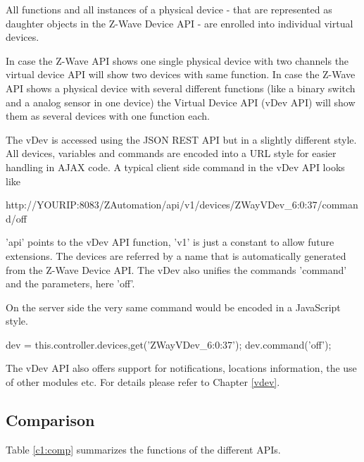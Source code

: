 All functions and all instances of a physical device - that are represented as daughter
objects in the Z-Wave Device API -  are enrolled into individual virtual devices. 

In case the Z-Wave API shows one single physical device with two channels the virtual device 
API will show two devices with same function. In case the Z-Wave API shows a physical
device with  several different functions (like a binary switch and a analog sensor in one 
device) the Virtual Device API (vDev API) will show them as several devices with one 
function each.

The vDev is accessed using the JSON REST API but in a slightly different style. All 
devices, variables and commands are encoded into a URL style for easier handling in AJAX
code. A typical client side command in the vDev API looks like

\begin{center}

http://YOURIP:8083/ZAutomation/api/v1/devices/ZWayVDev\_6:0:37/command/off

\end{center}

'api' points to the vDev API function, 'v1' is just a constant to allow future extensions. 
The devices are referred by a name that is automatically generated from the Z-Wave 
Device API. The vDev also unifies the commands 'command' and the parameters, here 'off'.

On the server side the very same command would be encoded in a JavaScript style.

\begin{center}
	dev = this.controller.devices,get('ZWayVDev\_6:0:37');
	dev.command('off');
\end{center}

The vDev API also offers support for notifications, locations information, the use of other
modules etc. For details please refer to Chapter \ref{vdev}.

\subsection{Comparison}

Table \ref{c1:comp} summarizes the functions of the different APIs.


